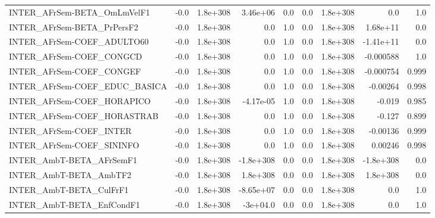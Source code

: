 \begin{tabular}{lrrrrrrrr}
INTER\_AFrSem-BETA\_OmLmVelF1           &        -0.0 &     1.8e+308 &   3.46e+06 &      0.0 &        0.0 &    1.8e+308 &          0.0 &           1.0 \\
INTER\_AFrSem-BETA\_PrPersF2            &        -0.0 &     1.8e+308 &        0.0 &      1.0 &        0.0 &    1.8e+308 &     1.68e+11 &           0.0 \\
INTER\_AFrSem-COEF\_ADULTO60            &        -0.0 &     1.8e+308 &        0.0 &      1.0 &        0.0 &    1.8e+308 &    -1.41e+11 &           0.0 \\
INTER\_AFrSem-COEF\_CONGCD              &        -0.0 &     1.8e+308 &        0.0 &      1.0 &        0.0 &    1.8e+308 &    -0.000588 &           1.0 \\
INTER\_AFrSem-COEF\_CONGEF              &        -0.0 &     1.8e+308 &        0.0 &      1.0 &        0.0 &    1.8e+308 &    -0.000754 &         0.999 \\
INTER\_AFrSem-COEF\_EDUC\_BASICA         &        -0.0 &     1.8e+308 &        0.0 &      1.0 &        0.0 &    1.8e+308 &     -0.00264 &         0.998 \\
INTER\_AFrSem-COEF\_HORAPICO            &        -0.0 &     1.8e+308 &  -4.17e-05 &      1.0 &        0.0 &    1.8e+308 &       -0.019 &         0.985 \\
INTER\_AFrSem-COEF\_HORASTRAB           &        -0.0 &     1.8e+308 &        0.0 &      1.0 &        0.0 &    1.8e+308 &       -0.127 &         0.899 \\
INTER\_AFrSem-COEF\_INTER               &        -0.0 &     1.8e+308 &        0.0 &      1.0 &        0.0 &    1.8e+308 &     -0.00136 &         0.999 \\
INTER\_AFrSem-COEF\_SININFO             &        -0.0 &     1.8e+308 &        0.0 &      1.0 &        0.0 &    1.8e+308 &      0.00246 &         0.998 \\
INTER\_AmbT-BETA\_AFrSemF1              &        -0.0 &     1.8e+308 &  -1.8e+308 &      0.0 &        0.0 &    1.8e+308 &    -1.8e+308 &           0.0 \\
INTER\_AmbT-BETA\_AmbTF2                &        -0.0 &     1.8e+308 &   1.8e+308 &      0.0 &        0.0 &    1.8e+308 &     1.8e+308 &           0.0 \\
INTER\_AmbT-BETA\_CulFrF1               &        -0.0 &     1.8e+308 &  -8.65e+07 &      0.0 &        0.0 &    1.8e+308 &          0.0 &           1.0 \\
INTER\_AmbT-BETA\_EnfCondF1             &        -0.0 &     1.8e+308 &   -3e+04.0 &      0.0 &        0.0 &    1.8e+308 &          0.0 &           1.0 \\

\end{tabular}
